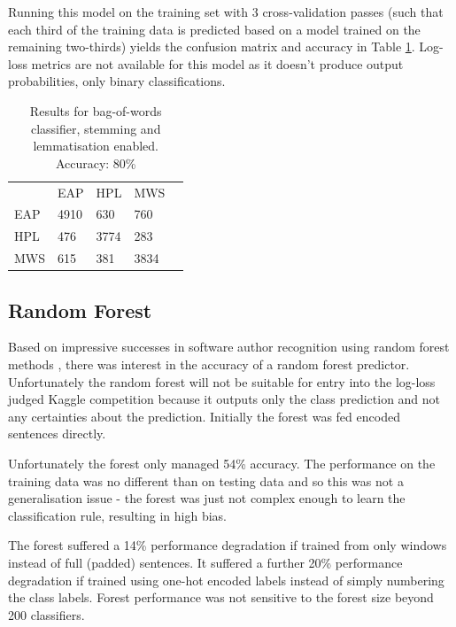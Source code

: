 Running this model on the training set with 3 cross-validation passes (such that each third of the training data is predicted based on a model trained on the remaining two-thirds) yields the confusion matrix and accuracy in Table \ref{tab:bow_cw}. Log-loss metrics are not available for this model as it doesn't produce output probabilities, only binary classifications.

\begin{table}[h]
\centering
\begin{tabular}{m{1cm}|m{1cm}|m{1cm}|m{1cm}|m{0cm}}
\multicolumn{1}{m{1cm}}{} & \multicolumn{1}{m{1cm}}{EAP} & \multicolumn{1}{m{1cm}}{HPL} & \multicolumn{1}{m{1cm}}{MWS} &\\[5pt]
\cline{2-4}
EAP & 4910 & 630 & 760 & \\[5pt]
\cline{2-4}
HPL & 476 & 3774 & 283 & \\[5pt]
\cline{2-4}
MWS & 615 & 381 & 3834 & \\[5pt]
\cline{2-4}
\end{tabular}
\caption{Results for bag-of-words classifier, stemming and lemmatisation enabled.\\Accuracy: 80\%}
\label{tab:bow_cw}
\end{table}

\subsection{Random Forest}
\label{sec:forest}

Based on impressive successes in software author recognition using random forest
methods \cite{c3}, there was interest in the accuracy of a random forest
predictor. Unfortunately the random forest will not be suitable for entry into
the log-loss judged Kaggle competition because it outputs only the class
prediction and not any certainties about the prediction.
Initially the forest was fed encoded sentences directly.

Unfortunately the forest only managed 54\% accuracy. The performance
on the training data was no different than on testing data and so this was not a
generalisation issue - the forest was just not complex enough to learn the
classification rule, resulting in high bias.

The forest suffered a 14\% performance degradation if trained from only windows
instead of full (padded) sentences. It suffered a further 20\% performance
degradation if trained using one-hot encoded labels instead of simply numbering
the class labels. Forest performance was not sensitive to the forest size beyond
200 classifiers. 

